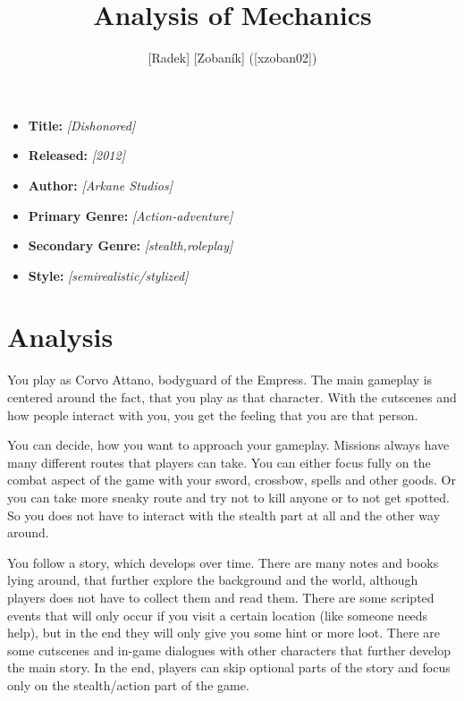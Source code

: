 \documentclass[a4paper,10pt,english]{article}
\title{%
Analysis of Mechanics%
}
\author{%
[Radek] [Zobaník] ([xzoban02])%
}
\date{}
\newcommand{\ph}[1]{\textit{[#1]}}
\begin{document}
\maketitle
\thispagestyle{empty}

{%
\large

\begin{itemize}

\item[] \textbf{Title:} \ph{Dishonored}

\item[] \textbf{Released:} \ph{2012}

\item[] \textbf{Author:} \ph{Arkane Studios}

\item[] \textbf{Primary Genre:} \ph{Action-adventure}

\item[] \textbf{Secondary Genre:} \ph{stealth,roleplay}

\item[] \textbf{Style:} \ph{semirealistic/stylized}

\end{itemize}

}

\section*{\centering Analysis}

You play as Corvo Attano, bodyguard of the Empress. The main gameplay is centered around the fact, that you play as that character. With the cutscenes and how people interact with you, you get the feeling that you are that person. \newline

You can decide, how you want to approach your gameplay. Missions always have many different routes that players can take. You can either focus fully on the combat aspect of the game with your sword, crossbow, spells and other goods. Or you can take more sneaky route and try not to kill anyone or to not get spotted. So you does not have to interact with the stealth part at all and the other way around.\newline

You follow a story, which develops over time. There are many notes and books lying around, that further explore the background and the world, although players does not have to collect them and read them. There are some scripted events that will only occur if you visit a certain location (like someone needs help), but in the end they will only give you some hint or more loot. There are some cutscenes and in-game dialogues with other characters that further develop the main story. In the end, players can skip optional parts of the story and focus only on the stealth/action part of the game.\newline
\end{document}
